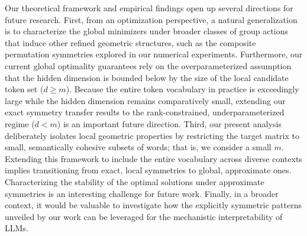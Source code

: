 \documentclass[11pt]{article}
\begin{document}
Our theoretical framework and empirical findings open up several directions for future research. First, from an optimization perspective, a natural generalization is to characterize the global minimizers under broader classes of group actions that induce other refined geometric structures, such as the composite permutation symmetries explored in our numerical experiments. Furthermore, our current global optimality guarantees rely on the overparameterized assumption that the hidden dimension is bounded below by the size of the local candidate token set (\(d \ge m\)). Because the entire token vocabulary in practice is exceedingly large while the hidden dimension remains comparatively small, extending our exact symmetry transfer results to the rank-constrained, underparameterized regime (\(d < m\)) is an important future direction. Third, our present analysis deliberately isolates local geometric properties by restricting the target matrix to small, semantically cohesive subsets of words; that is, we consider a small $m$. Extending this framework to include the entire vocabulary across diverse contexts implies transitioning from exact, local symmetries to global, approximate ones. Characterizing the stability of the optimal solutions under approximate symmetries is an interesting challenge for future work. Finally, in a broader context, it would be valuable to investigate how the explicitly symmetric patterns unveiled by our work can be leveraged for the mechanistic interpretability of LLMs.




\clearpage
\appendix 
\appendixpage
\addappheadtotoc 
\end{document}
